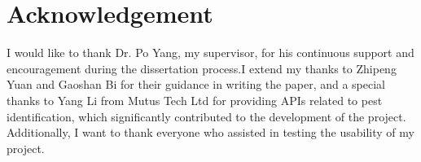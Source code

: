 \chapter*{\Large \center Acknowledgement}

I would like to thank Dr. Po Yang, my supervisor, for his continuous support and encouragement during the dissertation process.I extend my thanks to Zhipeng Yuan and Gaoshan Bi for their guidance in writing the paper, and a special thanks to Yang Li from Mutus Tech Ltd for providing APIs related to pest identification, which significantly contributed to the development of the project. Additionally, I want to thank everyone who assisted in testing the usability of my project. 
